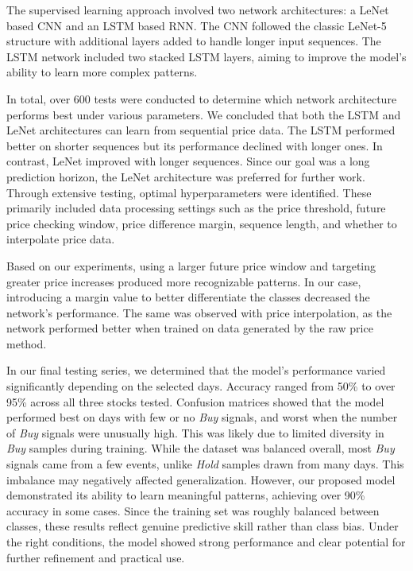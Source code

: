 \documentclass[a4paper,oneside,onecolumn,12pt]{book}
\begin{document}
The supervised learning approach involved two network architectures: a LeNet based CNN and an LSTM based RNN. The CNN followed the classic LeNet-5 structure with additional layers added to handle longer input sequences. The LSTM network included two stacked LSTM layers, aiming to improve the model's ability to learn more complex patterns.

In total, over 600 tests were conducted to determine which network architecture performs best under various parameters. We concluded that both the LSTM and LeNet architectures can learn from sequential price data. The LSTM performed better on shorter sequences but its performance declined with longer ones. In contrast, LeNet improved with longer sequences. Since our goal was a long prediction horizon, the LeNet architecture was preferred for further work. Through extensive testing, optimal hyperparameters were identified. These primarily included data processing settings such as the price threshold, future price checking window, price difference margin, sequence length, and whether to interpolate price data.

Based on our experiments, using a larger future price window and targeting greater price increases produced more recognizable patterns. In our case, introducing a margin value to better differentiate the classes decreased the network's performance. The same was observed with price interpolation, as the network performed better when trained on data generated by the raw price method.

In our final testing series, we determined that the model's performance varied significantly depending on the selected days. Accuracy ranged from 50\% to over 95\% across all three stocks tested. Confusion matrices showed that the model performed best on days with few or no \textit{Buy} signals, and worst when the number of \textit{Buy} signals were unusually high. This was likely due to limited diversity in \textit{Buy} samples during training. While the dataset was balanced overall, most \textit{Buy} signals came from a few events, unlike \textit{Hold} samples drawn from many days. This imbalance may negatively affected generalization. However, our proposed model demonstrated its ability to learn meaningful patterns, achieving over 90\% accuracy in some cases. Since the training set was roughly balanced between classes, these results reflect genuine predictive skill rather than class bias. Under the right conditions, the model showed strong performance and clear potential for further refinement and practical use.
\end{document}
